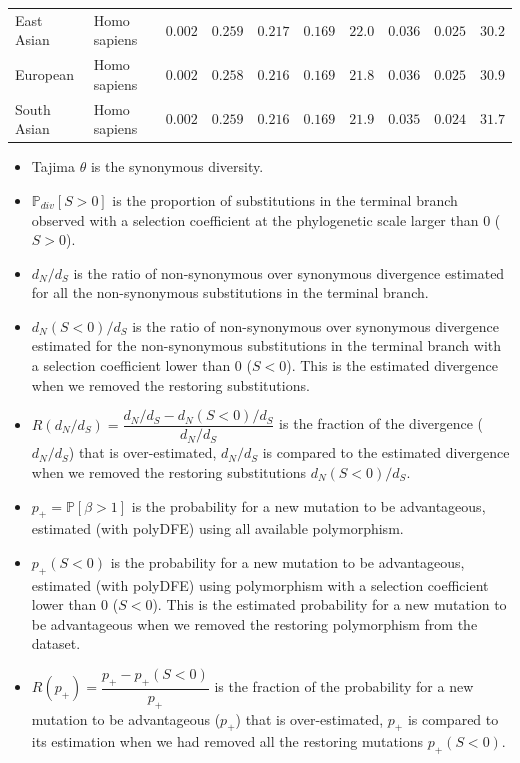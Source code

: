 \documentclass{article}
\newcommand{\proba}{\mathbb{P}}
\newcommand{\dn}{d_N}
\newcommand{\ds}{d_S}
\newcommand{\dnds}{\dn / \ds}
\newcommand{\Sphy}{S}
\newcommand{\Spop}{\beta}
\newcommand{\polyAdv}{ \Spop > 1}
\newcommand{\PpolyAdv}{\proba \left[ \polyAdv \right]}
\begin{document}
\begin{center}
\begin{longtable*}{|l|l|r|r|r|r|r|r|r|r|}
            East Asian &        Homo sapiens &               $ 0.002$ &                $ 0.259$ &        $ 0.217$ &              $ 0.169$ &           $  22.0$ &                   $ 0.036$ &                         $ 0.025$ &                      $  30.2$ \\
            European &        Homo sapiens &               $ 0.002$ &                $ 0.258$ &        $ 0.216$ &              $ 0.169$ &           $  21.8$ &                   $ 0.036$ &                         $ 0.025$ &                      $  30.9$ \\
            South Asian &        Homo sapiens &               $ 0.002$ &                $ 0.259$ &        $ 0.216$ &              $ 0.169$ &           $  21.9$ &                   $ 0.035$ &                         $ 0.024$ &                      $  31.7$ \\
        \end{longtable*}
    \end{center}
    \begin{itemize}
        \item Tajima $\theta$ is the synonymous diversity.
        \item $\mathbb{P}_{div}[\Sphy > 0]$ is the proportion of substitutions in the terminal branch observed with a selection coefficient at the phylogenetic scale larger than 0 ($\Sphy > 0$).
        \item $\dnds$ is the ratio of non-synonymous over synonymous divergence estimated for all the non-synonymous substitutions in the terminal branch.
        \item $\dn(\Sphy < 0) / \ds$ is the ratio of non-synonymous over synonymous divergence estimated for the non-synonymous substitutions in the terminal branch with a selection coefficient lower than 0 ($\Sphy < 0$).
        This is the estimated divergence when we removed the restoring substitutions.
        \item $R(\dnds)=\dfrac{\dnds - \dn(\Sphy < 0) / \ds}{\dnds}$ is the fraction of the divergence ($\dnds$) that is over-estimated, $\dnds$ is compared to the estimated divergence when we removed the restoring substitutions $\dn(\Sphy < 0) / \ds$.
        \item $p_+=\PpolyAdv$ is the probability for a new mutation to be advantageous, estimated (with polyDFE) using all available polymorphism.
        \item $p_+(\Sphy < 0)$ is the probability for a new mutation to be advantageous, estimated (with polyDFE) using polymorphism with a selection coefficient lower than 0 ($\Sphy < 0$).
        This is the estimated probability for a new mutation to be advantageous when we removed the restoring polymorphism from the dataset.
        \item $R(p_+)=\dfrac{p_+ - p_+(\Sphy < 0)}{p_+}$ is the fraction of the probability for a new mutation to be advantageous ($p_+$) that is over-estimated, $p_+$ is compared to its estimation when we had removed all the restoring mutations $p_+(\Sphy < 0)$.
    \end{itemize}
\end{document}
